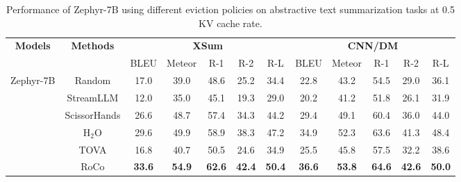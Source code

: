 \begin{table}[t!]
    \centering
    \small
    \begin{tabular}{cc|ccccc|ccccc}
    \toprule
    \multicolumn{1}{c}{\multirow{2}{*}{\textbf{Models}}} & \multirow{2}{*}{\textbf{Methods}} & \multicolumn{5}{c}{\textbf{XSum}}         & \multicolumn{5}{c}{\textbf{CNN/DM}}       \\
    \multicolumn{1}{c}{} &              & BLEU & Meteor & R-1  & R-2  & R-L  & BLEU & Meteor & R-1  & R-2  & R-L  \\
    \midrule
    \multirow{6}{*}{Zephyr-7B} & Random &17.0  &39.0  &48.6  &25.2  &34.4  &22.8  &43.2  &54.5  &29.0  &36.1  \\
                         & StreamLLM   &12.0  &35.0    &45.1 &19.3  &29.0  &20.2  &41.2    &51.8  &26.1  &31.9  \\
                         & ScissorHands &26.6  &48.7    &57.4  &34.3  &44.2  &29.4  &49.1    &60.4  &36.0  &44.0  \\
                         & H$_{\text{2}}$O   &29.6  &49.9    &58.9  &38.3  &47.2  &34.9  &52.3    &63.6  &41.3  &48.4  \\
                         & TOVA         &16.8  &40.7    &50.5  &24.6  &34.9  &25.5  &45.8    &57.5  &32.2  &38.6  \\
                         & RoCo         &\textbf{33.6}  &\textbf{54.9}    &\textbf{62.6}  &\textbf{42.4}  &\textbf{50.4}  &\textbf{36.6}  &\textbf{53.8}    &\textbf{64.6}  &\textbf{42.6}  &\textbf{50.0}  \\
    \bottomrule
    \end{tabular}
    \caption{Performance of Zephyr-7B using different eviction policies on abstractive text summarization tasks at 0.5 KV cache rate.}
    \label{table:zephyr}
\end{table}
